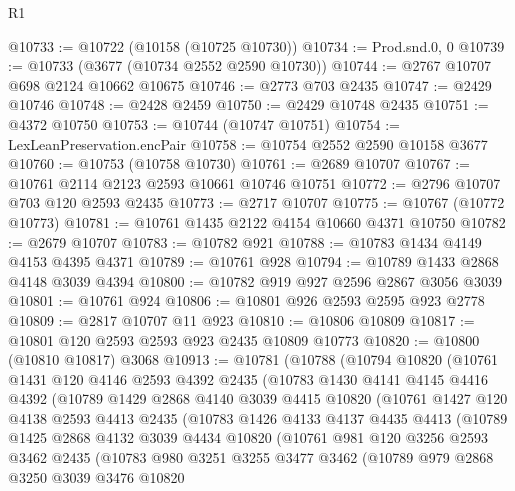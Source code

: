 \begin{lexlean}{R1}
\begin{coremodule}
@10733 := @10722 (@10158 (@10725 @10730))
@10734 := Prod.snd.{0, 0}
@10739 := @10733 (@3677 (@10734 @2552 @2590 @10730))
@10744 := @2767 @10707 @698 @2124 @10662 @10675
@10746 := @2773 @703 @2435
@10747 := @2429 @10746
@10748 := @2428 @2459
@10750 := @2429 @10748 @2435
@10751 := @4372 @10750
@10753 := @10744 (@10747 @10751)
@10754 := LexLeanPreservation.encPair
@10758 := @10754 @2552 @2590 @10158 @3677
@10760 := @10753 (@10758 @10730)
@10761 := @2689 @10707
@10767 := @10761 @2114 @2123 @2593 @10661 @10746 @10751
@10772 := @2796 @10707 @703 @120 @2593 @2435
@10773 := @2717 @10707
@10775 := @10767 (@10772 @10773)
@10781 := @10761 @1435 @2122 @4154 @10660 @4371 @10750
@10782 := @2679 @10707
@10783 := @10782 @921
@10788 := @10783 @1434 @4149 @4153 @4395 @4371
@10789 := @10761 @928
@10794 := @10789 @1433 @2868 @4148 @3039 @4394
@10800 := @10782 @919 @927 @2596 @2867 @3056 @3039
@10801 := @10761 @924
@10806 := @10801 @926 @2593 @2595 @923 @2778
@10809 := @2817 @10707 @11 @923
@10810 := @10806 @10809
@10817 := @10801 @120 @2593 @2593 @923 @2435 @10809 @10773
@10820 := @10800 (@10810 @10817) @3068
@10913 := @10781
    (@10788
      (@10794
        @10820
        (@10761
          @1431
          @120
          @4146
          @2593
          @4392
          @2435
          (@10783
            @1430
            @4141
            @4145
            @4416
            @4392
            (@10789
              @1429
              @2868
              @4140
              @3039
              @4415
              @10820
              (@10761
                @1427
                @120
                @4138
                @2593
                @4413
                @2435
                (@10783
                  @1426
                  @4133
                  @4137
                  @4435
                  @4413
                  (@10789
                    @1425
                    @2868
                    @4132
                    @3039
                    @4434
                    @10820
                    (@10761
                      @981
                      @120
                      @3256
                      @2593
                      @3462
                      @2435
                      (@10783
                        @980
                        @3251
                        @3255
                        @3477
                        @3462
                        (@10789
                          @979
                          @2868
                          @3250
                          @3039
                          @3476
                          @10820

\end{coremodule}
\end{lexlean}
